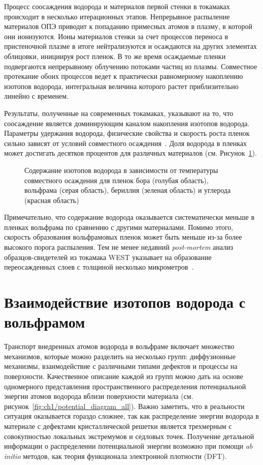 Процесс соосаждения водорода и материалов первой стенки в токамаках происходит в несколько итерационных этапов. Непрерывное распыление материалов ОПЭ приводит к попаданию примесных атомов в плазму, в которой они ионизуются. Ионы материалов стенки за счет процессов переноса в пристеночной плазме в итоге нейтрализуются и осаждаются на других элементах облицовки, инициируя рост пленок. В то же время осаждаемые пленки подвергаются непрерывному облучению потоками частиц из плазмы. Совместное протекание обоих процессов ведет к практически равномерному накоплению изотопов водорода, интегральная величина которого растет приблизительно линейно с временем.

Результаты, полученные на современных токамаках, указывают на то, что соосаждение является доминирующим каналом накопления изотопов водорода. Параметры удержания водорода, физические свойства и скорость роста пленок сильно зависят от условий совместного осаждения~\cite{Gasparyan2019,Krat2020,Krat2025}. Доля водорода в пленках может достигать десятков процентов для различных материалов (см. Рисунок~\cref{fig:ch1/codeposition_review}).
\begin{figure}[ht]
    \caption{Содержание изотопов водорода в зависимости от температуры совместного осаждения для пленок бора (голубая область), вольфрама (серая область), бериллия (зеленая область) и углерода (красная область)~\cite{Pitts2025}}\label{fig:ch1/codeposition_review}
\end{figure}
Примечательно, что содержание водорода оказывается систематически меньше в пленках вольфрама по сравнению с другими материалами. Помимо этого, скорость образования вольфрамовых пленок может быть меньше из-за более высокого порога распыления. Тем не менее недавний \textit{post-mortem} анализ образцов-свидетелей из токамака WEST указывает на образование переосажденных слоев с толщиной несколько микрометров~\cite{Bucalossi2024}.

\section{Взаимодействие изотопов водорода с вольфрамом}\label{sec:ch1/sec4}

Транспорт внедренных атомов водорода в вольфраме включает множество механизмов, которые можно разделить на несколько групп: диффузионные механизмы, взаимодействие с различными типами дефектов и процессы на поверхности. Качественное описание каждой из групп можно дать на основе одномерного представления пространственного распределения потенциальной энергии атомов водорода вблизи поверхности материала (см. рисунок~\cref{fig:ch1/potential_diagram_all}). Важно заметить, что в реальности ситуация оказывается гораздо сложнее, так как распределение энергии водорода в материале с дефектами кристаллической решетки является трехмерным с совокупностью локальных экстремумов и седловых точек. Получение детальной информации о распределении потенциальной энергии возможно при помощи \textit{ab initio} методов, как теория функционала электронной плотности (DFT). 

